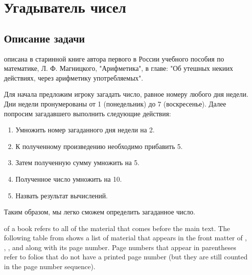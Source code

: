 \chapter{Угадыватель чисел}
\label{ch:from1to19}
\section{Описание задачи}
 описана в старинной книге автора первого в России учебного пособия по математике, Л. Ф. Магницкого, "Арифметика", в главе: "Об утешных некиих действиях, через арифметику употребляемых".

Для начала предложим игроку загадать число, равное номеру любого дня недели. Дни недели пронумерованы от 1 (понедельник) до 7 (воскресенье). Далее попросим загадавшего выполнить следующие действия:

\begin{enumerate}
\item Умножить номер загаданного дня недели на 2.
\item К полученному произведению необходимо прибавить 5.
\item Затем полученную сумму умножить на 5.
\item Полученное число умножить на 10.
\item Назвать результат вычислений.
\end{enumerate}
Таким образом, мы легко сможем определить загаданное число.


 of a book refers to all of the material that
comes before the main text.  The following table from shows a list of
material that appears in the front matter of \VDQI, \EI, \VE, and \BE
along with its page number.  Page numbers that appear in parentheses refer
to folios that do not have a printed page number (but they are still
counted in the page number sequence).
